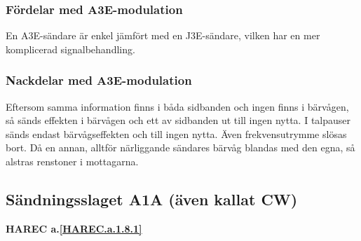 \subsubsection{Fördelar med A3E-modulation}

En A3E-sändare är enkel jämfört med en J3E-sändare, vilken har en mer
komplicerad signalbehandling.

\subsubsection{Nackdelar med A3E-modulation}

Eftersom samma information finns i båda sidbanden och ingen finns i bärvågen,
så sänds effekten i bärvågen och ett av sidbanden ut till ingen nytta. I
talpauser sänds endast bärvågseffekten och till ingen nytta. Även
frekvensutrymme slösas bort. Då en annan, alltför närliggande sändares bärvåg
blandas med den egna, så alstras renstoner i mottagarna.

\subsection{Sändningsslaget A1A (även kallat CW)}
\textbf{HAREC a.\ref{HAREC.a.1.8.1}\label{myHAREC.a.1.8.1}}

